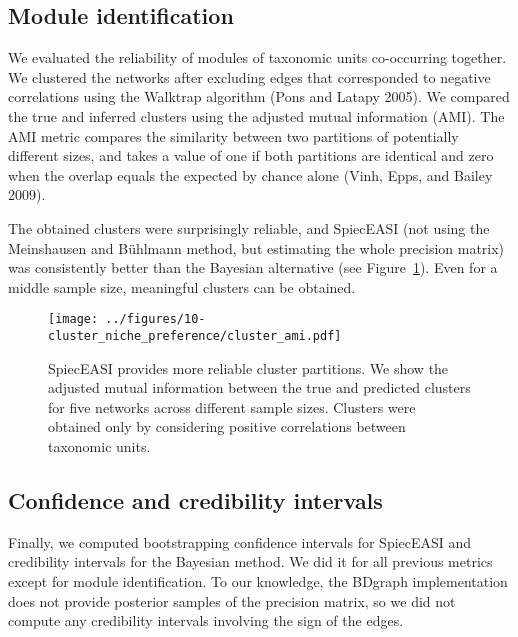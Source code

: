 \documentclass[
  a4paper,
]{article}
\begin{document}
\hypertarget{module-identification}{%
\subsection{Module identification}\label{module-identification}}

We evaluated the reliability of modules of taxonomic units co-occurring
together. We clustered the networks after excluding edges that
corresponded to negative correlations using the Walktrap algorithm (Pons
and Latapy 2005). We compared the true and inferred clusters using the
adjusted mutual information (AMI). The AMI metric compares the
similarity between two partitions of potentially different sizes, and
takes a value of one if both partitions are identical and zero when the
overlap equals the expected by chance alone (Vinh, Epps, and Bailey
2009).

The obtained clusters were surprisingly reliable, and SpiecEASI (not
using the Meinshausen and Bühlmann method, but estimating the whole
precision matrix) was consistently better than the Bayesian alternative
(see Figure~\ref{fig-ami}). Even for a middle sample size, meaningful
clusters can be obtained.

\begin{figure}

{\centering \texttt{[image: ../figures/10-cluster\_niche\_preference/cluster\_ami.pdf]}

}

\caption{\label{fig-ami}SpiecEASI provides more reliable cluster
partitions. We show the adjusted mutual information between the true and
predicted clusters for five networks across different sample sizes.
Clusters were obtained only by considering positive correlations between
taxonomic units.}

\end{figure}

\hypertarget{confidence-and-credibility-intervals}{%
\subsection{Confidence and credibility
intervals}\label{confidence-and-credibility-intervals}}

Finally, we computed bootstrapping confidence intervals for SpiecEASI
and credibility intervals for the Bayesian method. We did it for all
previous metrics except for module identification. To our knowledge, the
BDgraph implementation does not provide posterior samples of the
precision matrix, so we did not compute any credibility intervals
involving the sign of the edges.
\end{document}
